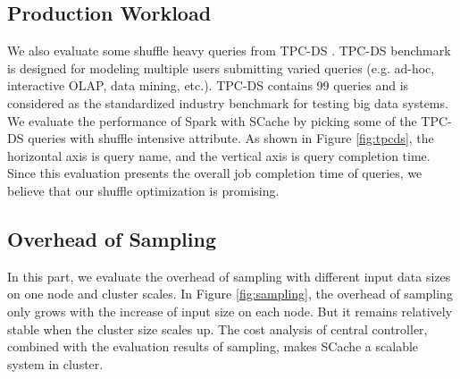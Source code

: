 \subsection{Production Workload}
We also evaluate some shuffle heavy queries from TPC-DS \cite{tpcds}. 
TPC-DS benchmark is designed for modeling multiple users submitting varied queries (e.g. ad-hoc, interactive OLAP, data mining, etc.). 
TPC-DS contains 99 queries and is considered as the standardized industry benchmark for testing big data systems. 
We evaluate the performance of Spark with SCache by picking some of the TPC-DS queries with shuffle intensive attribute. 
\ifrevision
\reversemarginpar
{}
\fi
As shown in Figure \ref{fig:tpcds}, the horizontal axis is query name, and the vertical axis is query completion time. 
Since this evaluation presents the overall job completion time of queries, we believe that our shuffle optimization is promising.
\subsection{Overhead of Sampling}
In this part, we evaluate the overhead of sampling with different input data sizes on one node and cluster scales. 
In Figure \ref{fig:sampling}, the overhead of sampling only grows with the increase of input size on each node. 
\ifrevision
\reversemarginpar
{}
\fi
But it remains relatively stable when the cluster size scales up.
The cost analysis of central controller, combined with the evaluation results of sampling, makes SCache a scalable system in cluster.
